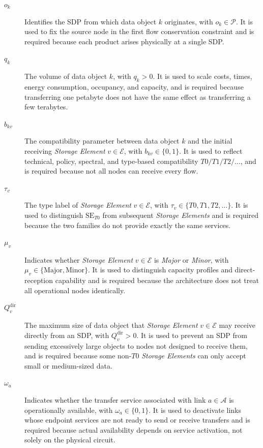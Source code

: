 \documentclass[a4paper,fleqn]{cas-dc}
\newcommand{\A}{\mathcal{A}}
\newcommand{\Pset}{\mathcal{P}}
\newcommand{\Eset}{\mathcal{E}}
\begin{document}
\begin{description} 

\item[\(o_k\)] Identifies the SDP from which data object \(k\) originates, with \(o_k\in\Pset\). It is used to fix the source node in the first flow conservation constraint and is required because each product arises physically at a single SDP. 

\item[\(q_k\)] The volume of data object \(k\), with \(q_k>0\). It is used to scale costs, times, energy consumption, occupancy, and capacity, and is required because transferring one petabyte does not have the same effect as transferring a few terabytes. 

\item[\(b_{kv}\)] The compatibility parameter between data object \(k\) and the initial receiving \emph{Storage Element} \(v\in\Eset\), with \(b_{kv}\in\{0,1\}\). It is used to reflect technical, policy, spectral, and type-based compatibility \(T0/T1/T2/\dots\), and is required because not all nodes can receive every flow. 

\item[\(\tau_v\)] The type label of \emph{Storage Element} \(v\in\Eset\), with \(\tau_v\in\{T0,T1,T2,\dots\}\). It is used to distinguish \(\mathrm{SE}_{T0}\) from subsequent \emph{Storage Elements} and is required because the two families do not provide exactly the same services. 

\item[\(\mu_v\)] Indicates whether \emph{Storage Element} \(v\in\Eset\) is \emph{Major} or \emph{Minor}, with \(\mu_v\in\{\mathrm{Major},\mathrm{Minor}\}\). It is used to distinguish capacity profiles and direct-reception capability and is required because the architecture does not treat all operational nodes identically. 

\item[\(Q_v^{\mathrm{dir}}\)] The maximum size of data object that \emph{Storage Element} \(v\in\Eset\) may receive directly from an SDP, with \(Q_v^{\mathrm{dir}}>0\). It is used to prevent an SDP from sending excessively large objects to nodes not designed to receive them, and is required because some non-\(T0\) \emph{Storage Elements} can only accept small or medium-sized data. 

\item[\(\omega_a\)] Indicates whether the transfer service associated with link \(a\in\A\) is operationally available, with \(\omega_a\in\{0,1\}\). It is used to deactivate links whose endpoint services are not ready to send or receive transfers and is required because actual availability depends on service activation, not solely on the physical circuit. 


\end{description}
\end{document}
